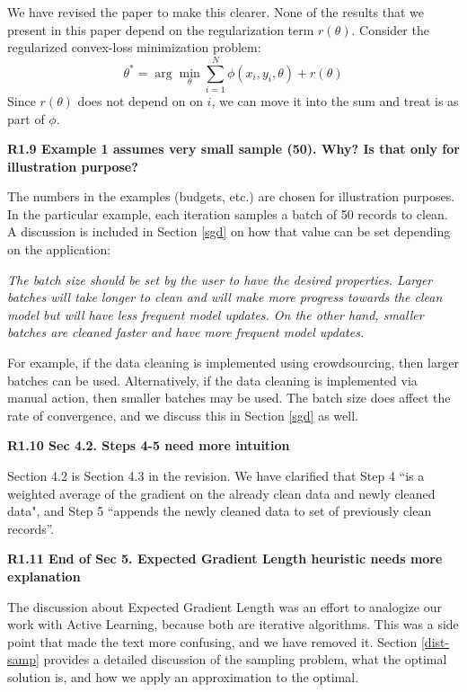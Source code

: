 \noindent We have revised the paper to make this clearer.
None of the results that we present in this paper depend on the regularization term $r(\theta)$.
Consider the regularized convex-loss minimization problem:
\[
 \theta^{*}=\arg\min_{\theta}\sum_{i=1}^{N}\phi(x_{i},y_{i},\theta) + r(\theta)
\]
Since $r(\theta)$ does not depend on on $i$, we can move it into the sum and treat is as part of $\phi$.

\vspace{0.5em}

\noindent\textbf{R1.9 Example 1 assumes very small sample (50). Why? Is that only for illustration purpose?}

\noindent   The numbers in the examples (budgets, etc.) are chosen for illustration purposes. In the particular example, each iteration samples a batch of 50 records to clean.  A discussion is included in Section \ref{sgd} on how that value can be set depending on the application:

\vspace{0.5em}
\emph{The batch size should be set by the user to have the desired properties.
Larger batches will take longer to clean and will make more progress towards the clean model but will have less frequent model updates.
On the other hand, smaller batches are cleaned faster and have more frequent model updates.}

\vspace{0.5em}

For example, if the data cleaning is implemented using crowdsourcing, then larger batches can be used. Alternatively, if the data cleaning is implemented via manual action, then smaller batches may be used.
The batch size does affect the rate of convergence, and we discuss this in Section \ref{sgd} as well. 

\vspace{0.5em}

\noindent\textbf{R1.10 Sec 4.2. Steps 4-5 need more intuition}

\noindent  Section 4.2 is Section 4.3 in the revision. We have clarified that Step 4 ``is a weighted average of the gradient on the already clean data and newly cleaned data", and Step 5 ``appends the newly cleaned data to set of previously clean records''.

\vspace{0.5em}

\noindent\textbf{R1.11 End of Sec 5. Expected Gradient Length heuristic needs more explanation}

\noindent  The discussion about Expected Gradient Length was an effort to analogize our work with Active Learning, because both are iterative algorithms. This was a side point that made the text more confusing, and we have removed it.
Section \ref{dist-samp} provides a detailed discussion of the sampling problem, what the optimal solution is, and how we apply an approximation to the optimal.

